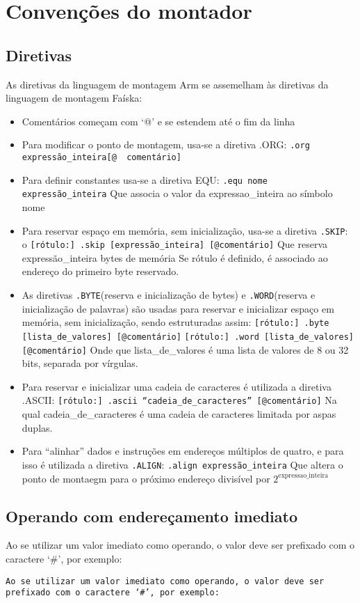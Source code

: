 \section{Convenções do montador}
\subsection{Diretivas}
As diretivas da linguagem de montagem Arm se assemelham às diretivas da linguagem de montagem Faíska:

\begin{itemize}
	\item Comentários começam com ‘@’ e se estendem até o fim da linha
	\item Para modificar o ponto de montagem, usa-se a diretiva .ORG:
	\subitem \verb|.org   expressão_inteira[@  comentário]|
	\item Para definir constantes usa-se a diretiva EQU:
	\subitem \verb|.equ nome expressão_inteira|
	\subitem Que associa o valor da expressao\_inteira ao símbolo nome
	\item Para reservar espaço em memória, sem inicialização, usa-se a diretiva   \verb|.SKIP|:
	\subitem o \verb|[rótulo:] .skip [expressão_inteira] [@comentário]|
	\subitem Que reserva expressão\_inteira bytes de memória
	\subitem  Se rótulo é definido, é associado ao endereço do primeiro byte reservado.
	\item As diretivas \verb|.BYTE|(reserva e inicialização de bytes)  e \verb|.WORD|(reserva e inicialização de palavras) são usadas para reservar e inicializar espaço em memória, sem inicialização, sendo estruturadas assim: 
	\subitem \verb |[rótulo:] .byte [lista_de_valores] [@comentário]|
	\subitem \verb |[rótulo:] .word [lista_de_valores] [@comentário]|
	\subitem Onde que lista\_de\_valores é uma lista de valores de 8 ou 32 bits, separada por vírgulas.
	\item Para reservar e inicializar uma cadeia de caracteres é utilizada a diretiva .ASCII:
	\subitem \verb |[rótulo:] .ascii “cadeia_de_caracteres” [@comentário]|
	\subitem Na qual cadeia\_de\_caracteres é uma cadeia de caracteres limitada por aspas duplas.
	\item Para “alinhar” dados e instruções em endereços múltiplos de quatro, e para isso é utilizada a diretiva \verb|.ALIGN|:
	\subitem \verb|.align expressão_inteira|
	\subitem Que altera o ponto de montaegm para o próximo endereço divisível por $2^\mathrm{expressao\_inteira}$
\end{itemize}

\subsection{Operando com endereçamento imediato}
Ao se utilizar um valor imediato como operando, o valor deve ser prefixado com o caractere ‘\#’, por exemplo:
\begin{verbatim}
Ao se utilizar um valor imediato como operando, o valor deve ser prefixado com o caractere ‘#’, por exemplo:
\end{verbatim}
